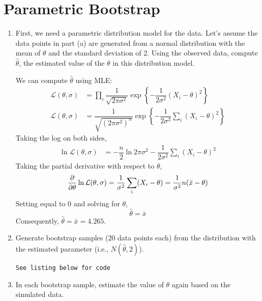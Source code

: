\documentclass{article}
\begin{document}
\section{Parametric Bootstrap}
\begin{enumerate}[label={(\alph*)}]
    \item First, we need a parametric distribution model for the data. Let’s
    assume the data points in part (a) are generated from a normal distribution
    with the mean of $\theta$ and the standard deviation of 2. Using
    the observed data, compute $\hat{\theta}$, the estimated value of the $\theta$ in this
    distribution model.
    
    We can compute $\hat{\theta}$ using MLE:
    \begin{align*}
        \mathcal{L}(\theta,\sigma) &= \prod_i
        \dfrac{1}{\sqrt{2\pi\sigma^2}}\exp{\left\{-\dfrac{1}{2\sigma^2}
        \left(X_i - \theta \right)^2\right\}} \\
        \mathcal{L}(\theta,\sigma) &= 
        \dfrac{1}{\sqrt{(2\pi\sigma^2)^n}}\exp{\left\{-\dfrac{1}{2\sigma^2}
        \sum_i{\left(X_i - \theta \right)^2} \right\}}
    \end{align*}
    Taking the log on both sides,
    \begin{align*}
        \ln\mathcal{L}(\theta,\sigma) &= -\dfrac{n}{2}\ln 2\pi\sigma^2 - 
        \dfrac{1}{2\sigma^2} \sum_i{(X_i - \theta)^2}
    \end{align*}
    Taking the partial derivative with respect to $\theta$,
    \begin{equation*}
        \dfrac{\partial}{\partial \theta} \ln \mathcal{L}
        (\theta, \sigma) =
        \dfrac{1}{\sigma^2} \sum_i (X_i - \theta) =
        \dfrac{1}{\sigma^2} n(\bar{x} - \theta) \\
    \end{equation*}
    Setting equal to 0 and solving for $\theta$,
    \begin{equation*}
        \boxed{\hat{\theta} = \bar{x}}
    \end{equation*} 
    Consequently, $\boxed{\hat{\theta} = \bar{x} = 4.265}$.
    
    \item Generate bootstrap samples (20 data points each) from the distribution
    with the estimated parameter (i.e., $N(\hat{\theta},2)$).
    
    \texttt{See listing below for code}
    
    \item In each bootstrap sample, estimate the value of $\theta$ again based on the
    simulated data. 
    

\end{enumerate}
\end{document}
